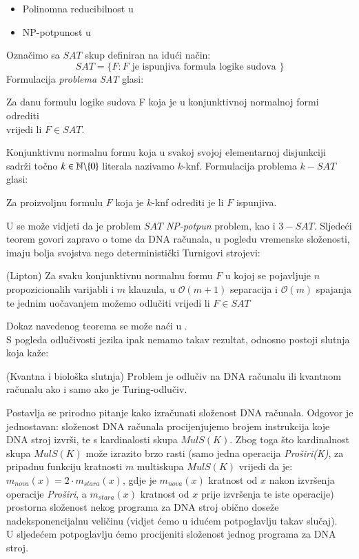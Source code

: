 \documentclass[a4paper,oneside,12pt]{memoir} %
\begin{document}
\begin{spacing}{1.5}
\begin{itemize}
 	\item Polinomna reducibilnost u \cite[str. ~272]{Sipser}
 	\item NP-potpunost u \cite[str. ~276]{Sipser}
\end{itemize}
Označimo sa $SAT$ skup definiran na idući način:
\[SAT=\{F: F \textrm{ je ispunjiva formula logike sudova }\}\]
Formulacija \textit{problema SAT} glasi:\\
\begin{center}
Za danu formulu logike sudova F koja je u konjunktivnoj normalnoj formi odrediti\\ vrijedi li $F \in  SAT$.
\end{center}
Konjunktivnu normalnu formu koja u svakoj svojoj elementarnoj disjunkciji sadrži točno $k \in \mathbb{N} \backslash \{0\}$ literala nazivamo $k$-knf. Formulacija problema $k-SAT$ glasi:
\begin{center}
	Za proizvoljnu formulu $F$ koja je $k$-knf odrediti je li $F$ ispunjiva. 
\end{center} 
U \cite[str. ~276-283]{Sipser} se može vidjeti da je problem $SAT$ \textit{NP-potpun} problem, kao i $3-SAT$.
Sljedeći teorem govori zapravo o tome da DNA računala, u pogledu vremenske složenosti, imaju bolja svojstva nego deterministički Turnigovi strojevi:
\begin{thm} (Lipton)
Za svaku konjunktivnu normalnu formu $F$ u kojoj se pojavljuje $n$ propozicionalih varijabli i $m$ klauzula, u $\mathcal{O}(m+1)$ separacija i $\mathcal{O}(m)$ spajanja te jednim uočavanjem možemo odlučiti vrijedi li $F \in SAT$
\end{thm}
Dokaz navedenog teorema se može naći u \cite{Lipton}.\\
S pogleda odlučivosti jezika ipak nemamo takav rezultat, odnosno postoji slutnja koja kaže:
\begin{conj} (Kvantna i biološka slutnja) Problem je odlučiv na DNA računalu ili kvantnom računalu ako i samo ako je Turing-odlučiv.
\end{conj}
Postavlja se prirodno pitanje kako izračunati složenost DNA računala. Odgovor je jednostavan: složenost DNA računala procijenjujemo brojem instrukcija koje DNA stroj izvrši, te s kardinalosti skupa $MulS(K)$. Zbog toga što kardinalnost skupa $MulS(K)$ može izrazito brzo rasti (samo jedna operacija \textit{Proširi(K)}, za pripadnu funkciju kratnosti $m$ multiskupa $MulS(K)$ vrijedi da je: $m_{nova}(x)=2\cdot m_{stara}(x)$, gdje je $m_{nova}(x)$ kratnost od $x$ nakon izvršenja operacije \textit{Proširi}, a $m_{stara}(x)$ kratnost od $x$ prije izvršenja te iste operacije) prostorna složenost nekog programa za DNA stroj obično doseže nadeksponencijalnu veličinu (vidjet ćemo u idućem potpoglavlju takav slučaj). \\
U sljedećem potpoglavlju ćemo procijeniti složenost jednog programa za DNA stroj.

\end{spacing}
\end{document}
